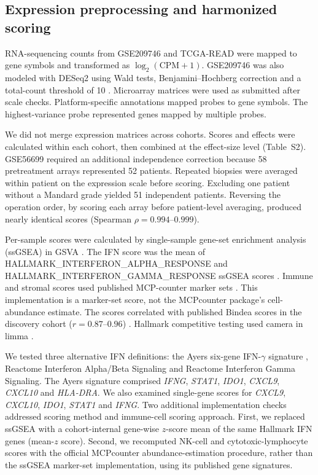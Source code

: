 \documentclass[11pt,a4paper]{article}
\begin{document}
\subsection{Expression preprocessing and harmonized scoring}

RNA-sequencing counts from GSE209746 and TCGA-READ were mapped to gene symbols and transformed as $\log_2(\mathrm{CPM}+1)$. GSE209746 was also modeled with DESeq2 using Wald tests, Benjamini--Hochberg correction and a total-count threshold of 10 \cite{Love}. Microarray matrices were used as submitted after scale checks. Platform-specific annotations mapped probes to gene symbols. The highest-variance probe represented genes mapped by multiple probes.

We did not merge expression matrices across cohorts. Scores and effects were calculated within each cohort, then combined at the effect-size level (Table~S2). GSE56699 required an additional independence correction because 58 pretreatment arrays represented 52 patients. Repeated biopsies were averaged within patient on the expression scale before scoring. Excluding one patient without a Mandard grade yielded 51 independent patients. Reversing the operation order, by scoring each array before patient-level averaging, produced nearly identical scores (Spearman $\rho=0.994$--$0.999$).

Per-sample scores were calculated by single-sample gene-set enrichment analysis (ssGSEA) in GSVA \cite{Hanzelmann}. The IFN score was the mean of HALLMARK\_INTERFERON\_ALPHA\_RESPONSE and HALLMARK\_INTERFERON\_GAMMA\_RESPONSE ssGSEA scores \cite{Liberzon}. Immune and stromal scores used published MCP-counter marker sets \cite{Becht}. This implementation is a marker-set score, not the MCPcounter package's cell-abundance estimate. The scores correlated with published Bindea scores in the discovery cohort ($r=0.87$--$0.96$) \cite{Bindea}. Hallmark competitive testing used camera \cite{Wu} in limma \cite{Ritchie}.

We tested three alternative IFN definitions: the Ayers six-gene IFN-$\gamma$ signature \cite{Ayers}, Reactome Interferon Alpha/Beta Signaling and Reactome Interferon Gamma Signaling. The Ayers signature comprised \textit{IFNG}, \textit{STAT1}, \textit{IDO1}, \textit{CXCL9}, \textit{CXCL10} and \textit{HLA-DRA}. We also examined single-gene scores for \textit{CXCL9}, \textit{CXCL10}, \textit{IDO1}, \textit{STAT1} and \textit{IFNG}. Two additional implementation checks addressed scoring method and immune-cell scoring approach. First, we replaced ssGSEA with a cohort-internal gene-wise $z$-score mean of the same Hallmark IFN genes (mean-$z$ score). Second, we recomputed NK-cell and cytotoxic-lymphocyte scores with the official MCPcounter abundance-estimation procedure, rather than the ssGSEA marker-set implementation, using its published gene signatures.
\end{document}
